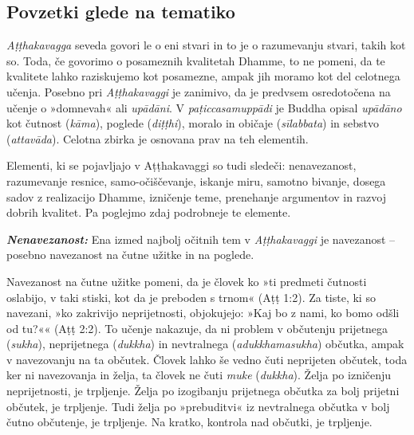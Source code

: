\subsection{Povzetki glede na tematiko}

\emph{Aṭṭhakavagga} seveda govori le o eni stvari in to je o razumevanju
stvari, takih kot so. Toda, če govorimo o posameznih kvalitetah Dhamme,
to ne pomeni, da te kvalitete lahko raziskujemo kot posamezne, ampak jih
moramo kot del celotnega učenja. Posebno pri \emph{Aṭṭhakavaggi} je
zanimivo, da je predvsem osredotočena na učenje o »domnevah« ali
\emph{upādāni}. V \emph{paṭiccasamuppādi} je Buddha opisal
\emph{upādāno} kot čutnost (\emph{kāma}), poglede (\emph{diṭṭhi}),
moralo in običaje (\emph{sīlabbata}) in sebstvo (\emph{attavāda}).
Celotna zbirka je osnovana prav na teh elementih.

Elementi, ki se pojavljajo v Aṭṭhakavaggi so tudi sledeči: nenavezanost,
razumevanje resnice, samo-očiščevanje, iskanje miru, samotno bivanje,
dosega sadov z realizacijo Dhamme, izničenje teme, prenehanje argumentov
in razvoj dobrih kvalitet. Pa poglejmo zdaj podrobneje te elemente.

\textbf{\emph{Nenavezanost:}} Ena izmed najbolj očitnih tem v
\emph{Aṭṭhakavaggi} je navezanost -- posebno navezanost na čutne užitke
in na poglede.

Navezanost na čutne užitke pomeni, da je človek ko »ti predmeti čutnosti
oslabijo, v taki stiski, kot da je preboden s trnom« (Aṭṭ 1:2). Za
tiste, ki so navezani, »ko zakrivijo neprijetnosti, objokujejo: »Kaj bo
z nami, ko bomo odšli od tu?«« (Aṭṭ 2:2). To učenje nakazuje, da ni
problem v občutenju prijetnega (\emph{sukha}), neprijetnega
(\emph{dukkha}) in nevtralnega (\emph{adukkhamasukha}) občutka, ampak v
navezovanju na ta občutek. Človek lahko še vedno čuti neprijeten
občutek, toda ker ni navezovanja in želja, ta človek ne čuti \emph{muke}
(\emph{dukkha}). Želja po izničenju neprijetnosti, je trpljenje. Želja
po izogibanju prijetnega občutka za bolj prijetni občutek, je trpljenje.
Tudi želja po »prebuditvi« iz nevtralnega občutka v bolj čutno
občutenje, je trpljenje. Na kratko, kontrola nad občutki, je trpljenje.

